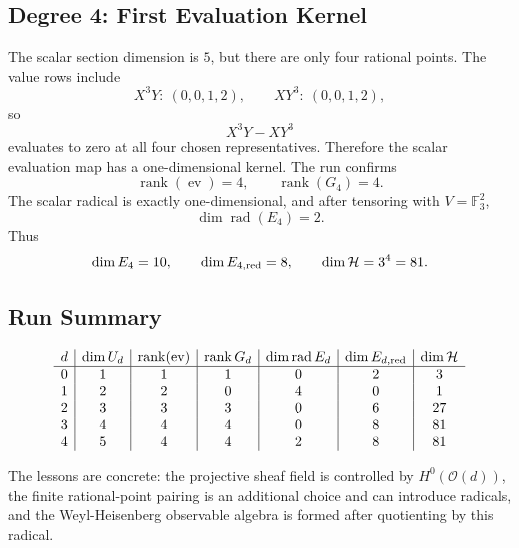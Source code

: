 \subsection{Degree 4: First Evaluation Kernel}

The scalar section dimension is \(5\), but there are only four rational
points.  The value rows include
\[
  X^3Y:\ (0,0,1,2),\qquad
  XY^3:\ (0,0,1,2),
\]
so
\[
  X^3Y-XY^3
\]
evaluates to zero at all four chosen representatives.  Therefore the scalar
evaluation map has a one-dimensional kernel.  The run confirms
\[
  \operatorname{rank}(\operatorname{ev})=4,\qquad
  \operatorname{rank}(G_4)=4.
\]
The scalar radical is exactly one-dimensional, and after tensoring with
\(V=\mathbb F_3^2\),
\[
  \dim\operatorname{rad}(E_4)=2.
\]
Thus
\[
  \dim E_4=10,\qquad
  \dim E_{4,\rm red}=8,\qquad
  \dim\mathcal H=3^4=81.
\]

\subsection{Run Summary}

\[
\begin{array}{c|c|c|c|c|c|c}
d&\dim U_d&\operatorname{rank}(\operatorname{ev})&
\operatorname{rank}G_d&\dim\operatorname{rad}E_d&
\dim E_{d,\rm red}&\dim\mathcal H\\
\hline
0&1&1&1&0&2&3\\
1&2&2&0&4&0&1\\
2&3&3&3&0&6&27\\
3&4&4&4&0&8&81\\
4&5&4&4&2&8&81
\end{array}
\]

The lessons are concrete: the projective sheaf field is controlled by
\(H^0(\mathcal O(d))\), the finite rational-point pairing is an additional
choice and can introduce radicals, and the Weyl-Heisenberg observable algebra
is formed after quotienting by this radical.
